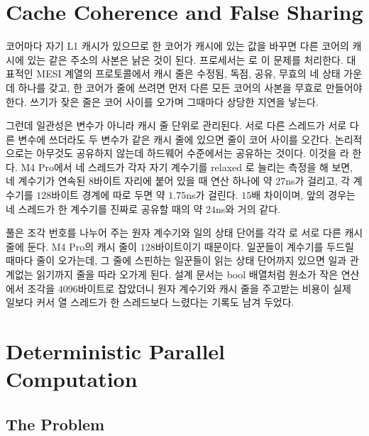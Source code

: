 \section{Cache Coherence and False Sharing}
\label{sec:false-sharing}

코어마다 자기 L1 캐시가 있으므로 한 코어가 캐시에 있는 값을 바꾸면 다른 코어의 캐시에 있는 같은 주소의 사본은 낡은 것이 된다. 프로세서는 로 이 문제를 처리한다. 대표적인 MESI 계열의 프로토콜에서 캐시 줄은 수정됨, 독점, 공유, 무효의 네 상태 가운데 하나를 갖고, 한 코어가 줄에 쓰려면 먼저 다른 모든 코어의 사본을 무효로 만들어야 한다\cite{papamarcos1984}. 쓰기가 잦은 줄은 코어 사이를 오가며 그때마다 상당한 지연을 낳는다.

그런데 일관성은 변수가 아니라 캐시 줄 단위로 관리된다. 서로 다른 스레드가 서로 다른 변수에 쓰더라도 두 변수가 같은 캐시 줄에 있으면 줄이 코어 사이를 오간다. 논리적으로는 아무것도 공유하지 않는데 하드웨어 수준에서는 공유하는 것이다. 이것을 라 한다. M4 Pro에서 네 스레드가 각자 자기 계수기를 relaxed 로 늘리는 측정을 해 보면, 네 계수기가 연속된 $8$바이트 자리에 붙어 있을 때 연산 하나에 약 $27$ns가 걸리고, 각 계수기를 $128$바이트 경계에 따로 두면 약 $1.75$ns가 걸린다. $15$배 차이이며, 앞의 경우는 네 스레드가 한 계수기를 진짜로 공유할 때의 약 $24$ns와 거의 같다.

\begin{instardust}
풀은 조각 번호를 나누어 주는 원자 계수기와 일의 상태 단어를 각각 로 서로 다른 캐시 줄에 둔다. M4 Pro의 캐시 줄이 $128$바이트이기 때문이다. 일꾼들이 계수기를 두드릴 때마다 줄이 오가는데, 그 줄에 스핀하는 일꾼들이 읽는 상태 단어까지 있으면 일과 관계없는 읽기까지 줄을 따라 오가게 된다. 설계 문서는 bool 배열처럼 원소가 작은 연산에서 조각을 $4096$바이트로 잡았더니 원자 계수기와 캐시 줄을 주고받는 비용이 실제 일보다 커서 열 스레드가 한 스레드보다 느렸다는 기록도 남겨 두었다.
\end{instardust}

\section{Deterministic Parallel Computation}
\label{sec:deterministic}

\subsection{The Problem}

